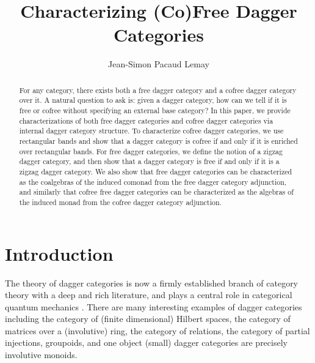 \documentclass[10pt]{article}
\title{Characterizing (Co)Free Dagger Categories}
\author{Jean-Simon Pacaud Lemay}
\begin{document}
\allowdisplaybreaks

\maketitle

\begin{abstract} For any category, there exists both a free dagger category and a cofree dagger category over it. A natural question to ask is: given a dagger category, how can we tell if it is free or cofree without specifying an external base category? In this paper, we provide characterizations of both free dagger categories and cofree dagger categories via internal dagger category structure. To characterize cofree dagger categories, we use rectangular bands and show that a dagger category is cofree if and only if it is enriched over rectangular bands. For free dagger categories, we define the notion of a zigzag dagger category, and then show that a dagger category is free if and only if it is a zigzag dagger category. We also show that free dagger categories can be characterized as the coalgebras of the induced comonad from the free dagger category adjunction, and similarly that cofree free dagger categories can be characterized as the algebras of the induced monad from the cofree dagger category adjunction. \end{abstract}



\section{Introduction}

The theory of dagger categories is now a firmly established branch of category theory with a deep and rich literature, and plays a central role in categorical quantum mechanics \cite{heunen2009categorical}. There are many interesting examples of dagger categories including the category of (finite dimensional) Hilbert spaces, the category of matrices over a (involutive) ring, the category of relations, the category of partial injections, groupoids, and one object (small) dagger categories are precisely involutive monoids. 
\end{document}
